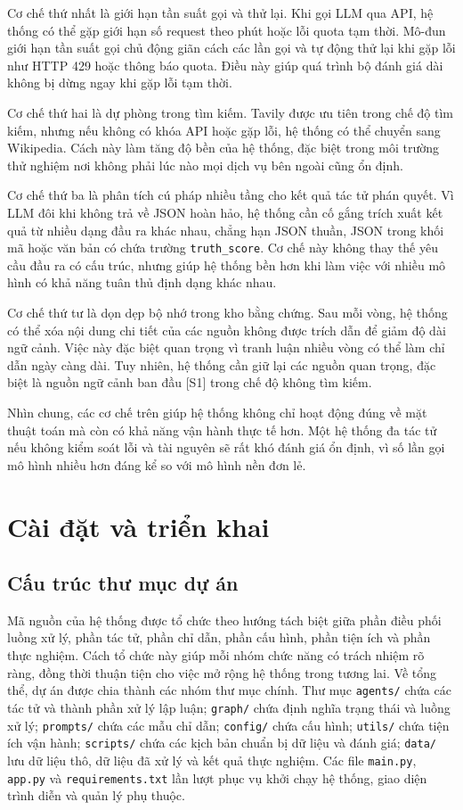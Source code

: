﻿\documentclass[oneside,a4paper,12pt]{extreport}
\begin{document}
Cơ chế thứ nhất là giới hạn tần suất gọi và thử lại. Khi gọi LLM qua API, hệ thống có thể gặp giới hạn số request theo phút hoặc lỗi quota tạm thời. Mô-đun giới hạn tần suất gọi chủ động giãn cách các lần gọi và tự động thử lại khi gặp lỗi như HTTP 429 hoặc thông báo quota. Điều này giúp quá trình bộ đánh giá dài không bị dừng ngay khi gặp lỗi tạm thời.

Cơ chế thứ hai là dự phòng trong tìm kiếm. Tavily được ưu tiên trong chế độ tìm kiếm, nhưng nếu không có khóa API hoặc gặp lỗi, hệ thống có thể chuyển sang Wikipedia. Cách này làm tăng độ bền của hệ thống, đặc biệt trong môi trường thử nghiệm nơi không phải lúc nào mọi dịch vụ bên ngoài cũng ổn định.

Cơ chế thứ ba là phân tích cú pháp nhiều tầng cho kết quả tác tử phán quyết. Vì LLM đôi khi không trả về JSON hoàn hảo, hệ thống cần cố gắng trích xuất kết quả từ nhiều dạng đầu ra khác nhau, chẳng hạn JSON thuần, JSON trong khối mã hoặc văn bản có chứa trường \texttt{truth\_score}. Cơ chế này không thay thế yêu cầu đầu ra có cấu trúc, nhưng giúp hệ thống bền hơn khi làm việc với nhiều mô hình có khả năng tuân thủ định dạng khác nhau.

Cơ chế thứ tư là dọn dẹp bộ nhớ trong kho bằng chứng. Sau mỗi vòng, hệ thống có thể xóa nội dung chi tiết của các nguồn không được trích dẫn để giảm độ dài ngữ cảnh. Việc này đặc biệt quan trọng vì tranh luận nhiều vòng có thể làm chỉ dẫn ngày càng dài. Tuy nhiên, hệ thống cần giữ lại các nguồn quan trọng, đặc biệt là nguồn ngữ cảnh ban đầu [S1] trong chế độ không tìm kiếm.

Nhìn chung, các cơ chế trên giúp hệ thống không chỉ hoạt động đúng về mặt thuật toán mà còn có khả năng vận hành thực tế hơn. Một hệ thống đa tác tử nếu không kiểm soát lỗi và tài nguyên sẽ rất khó đánh giá ổn định, vì số lần gọi mô hình nhiều hơn đáng kể so với mô hình nền đơn lẻ.
\chapter{Cài đặt và triển khai}

\section{Cấu trúc thư mục dự án}

Mã nguồn của hệ thống được tổ chức theo hướng tách biệt giữa phần điều phối luồng xử lý, phần tác tử, phần chỉ dẫn, phần cấu hình, phần tiện ích và phần thực nghiệm. Cách tổ chức này giúp mỗi nhóm chức năng có trách nhiệm rõ ràng, đồng thời thuận tiện cho việc mở rộng hệ thống trong tương lai. Về tổng thể, dự án được chia thành các nhóm thư mục chính. Thư mục \texttt{agents/} chứa các tác tử và thành phần xử lý lập luận; \texttt{graph/} chứa định nghĩa trạng thái và luồng xử lý; \texttt{prompts/} chứa các mẫu chỉ dẫn; \texttt{config/} chứa cấu hình; \texttt{utils/} chứa tiện ích vận hành; \texttt{scripts/} chứa các kịch bản chuẩn bị dữ liệu và đánh giá; \texttt{data/} lưu dữ liệu thô, dữ liệu đã xử lý và kết quả thực nghiệm. Các file \texttt{main.py}, \texttt{app.py} và \texttt{requirements.txt} lần lượt phục vụ khởi chạy hệ thống, giao diện trình diễn và quản lý phụ thuộc.
\end{document}
